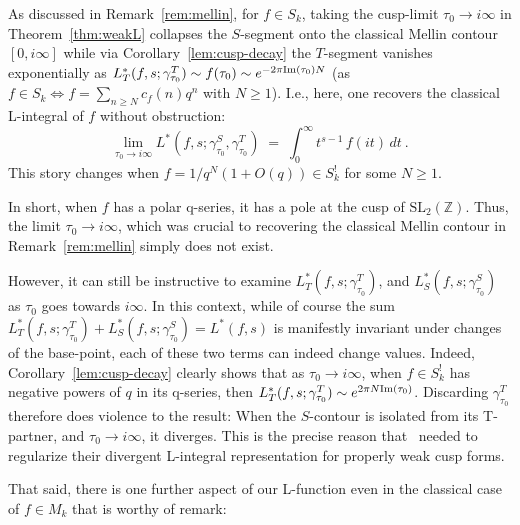 \documentclass[11pt]{article}
\newcommand{\ZZ}{\mathbb{Z}}
\newcommand{\SLZ}{\mathrm{SL}_2(\ZZ)}
\begin{document}
As discussed in Remark~\ref{rem:mellin}, for $f \in S_k$, taking the cusp-limit
$\tau_0 \to i\infty$ in Theorem~\ref{thm:weakL} collapses the $S$-segment 
onto the classical Mellin contour $[0, i\infty]$ while via Corollary~\ref{lem:cusp-decay} 
the $T$-segment vanishes exponentially as $L^*_T(f, s; \gamma^T_{\tau_0}) \sim f(\tau_0) 
\sim e^{-2\pi {\rm Im}(\tau_0) N}$ (as $f \in S_k \Leftrightarrow f = \sum_{n \geq N} c_f(n) q^n$ with $N \geq 1$). 
I.e., here, one recovers the classical L-integral of $f$ without obstruction:
\begin{equation}\label{eq:Mellin-recovery}
\lim_{\tau_0 \to i\infty}\!
L^*(f, s; \gamma^S_{\tau_0}, \gamma^T_{\tau_0})
\;=\; \int_0^\infty\! t^{s - 1}\,f(it)\,dt~.
\end{equation}  
This story changes when $f = 1/q^N (1 + O(q)) \in S_k^!$ for some $N \geq 1$. 

In short, when $f$ has a polar q-series, it has a pole at the cusp of $\SLZ$. Thus, 
the limit $\tau_0 \to i \infty$, which was crucial to recovering the classical Mellin contour 
in Remark~\ref{rem:mellin} simply does not exist.

However, it can still be instructive to examine $L^*_T(f, s; \gamma^T_{\tau_0})$, 
and $L^*_S(f, s; \gamma^S_{\tau_0})$ as $\tau_0$ goes towards $i \infty$. 
In this context, while of course the sum $L^*_T(f, s; \gamma^T_{\tau_0}) + 
L^*_S(f, s; \gamma^S_{\tau_0}) = L^*(f,s)$ is manifestly invariant under 
changes of the base-point, each of these two terms can indeed change values. Indeed, 
Corollary~\ref{lem:cusp-decay} clearly shows that as $\tau_0 \to i \infty$, when $f \in S_k^!$ 
has negative powers of $q$ in its q-series, then $L^*_T(f, s; \gamma^T_{\tau_0}) \sim 
e^{2 \pi N {\rm Im}(\tau_0)}$. Discarding $\gamma^T_{\tau_0}$ therefore does violence to the result: 
When the $S$-contour is isolated from its T-partner, and $\tau_0 \to i \infty$, it diverges. This is the precise
reason that~\cite{BFK2011} needed to regularize their divergent L-integral representation for properly weak 
cusp forms. 

That said, there is one further aspect of our L-function even in the classical 
case of $f \in M_k$ that is worthy of remark:
\end{document}

